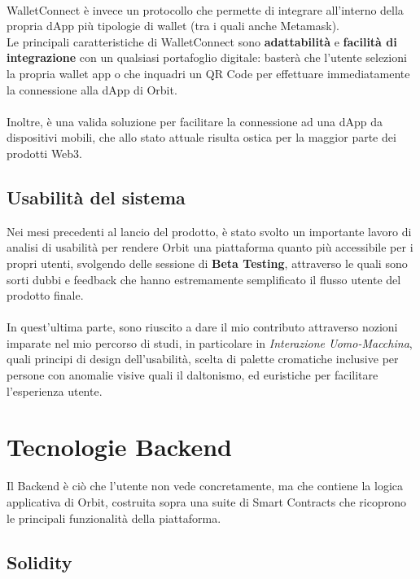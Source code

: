 \documentclass[12pt,a4paper]{report}
\begin{document}
\noindent \\WalletConnect è invece un protocollo che permette di integrare all'interno della propria dApp più tipologie di wallet (tra i quali anche Metamask).\\Le principali caratteristiche di WalletConnect sono \textbf{adattabilità} e \textbf{facilità di integrazione} con un qualsiasi portafoglio digitale: basterà che l'utente selezioni la propria wallet app o che inquadri un QR Code per effettuare immediatamente la connessione alla dApp di Orbit. 
\\\\Inoltre, è una valida soluzione per facilitare la connessione ad una dApp da dispositivi mobili, che allo stato attuale risulta ostica per la maggior parte dei prodotti Web3.

\subsection{Usabilità del sistema}

Nei mesi precedenti al lancio del prodotto, è stato svolto un importante lavoro di analisi di usabilità per rendere Orbit una piattaforma quanto più accessibile per i propri utenti, svolgendo delle sessione di \textbf{Beta Testing}, attraverso le quali sono sorti dubbi e feedback che hanno estremamente semplificato il flusso utente del prodotto finale. 
\\\\In quest'ultima parte, sono riuscito a dare il mio contributo attraverso nozioni imparate nel mio percorso di studi, in particolare in \textit{Interazione Uomo-Macchina}, quali principi di design dell'usabilità, scelta di palette cromatiche inclusive per persone con anomalie visive quali il daltonismo, ed euristiche per facilitare l'esperienza utente.  

\section{Tecnologie Backend}

Il Backend è ciò che l'utente non vede concretamente, ma che contiene la logica applicativa di Orbit, costruita sopra una suite di Smart Contracts che ricoprono le principali funzionalità della piattaforma.

\subsection{Solidity}
\end{document}
